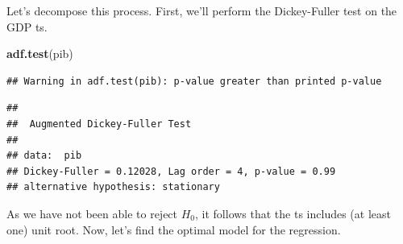 \documentclass[11pt, a4paper]{report}
\newenvironment{Shaded}{\begin{snugshade}}{\end{snugshade}}
\newcommand{\KeywordTok}[1]{\textcolor[rgb]{0.13,0.29,0.53}{\textbf{#1}}}
\newcommand{\NormalTok}[1]{#1}
\theoremstyle{plain}
\theoremstyle{plain}
\theoremstyle{remark}
\begin{document}
Let's decompose this process. First, we'll perform the Dickey-Fuller
test on the GDP ts.

\begin{Shaded}
\begin{Highlighting}[]
\KeywordTok{adf.test}\NormalTok{(pib)}
\end{Highlighting}
\end{Shaded}

\begin{verbatim}
## Warning in adf.test(pib): p-value greater than printed p-value
\end{verbatim}

\begin{verbatim}
## 
##  Augmented Dickey-Fuller Test
## 
## data:  pib
## Dickey-Fuller = 0.12028, Lag order = 4, p-value = 0.99
## alternative hypothesis: stationary
\end{verbatim}

As we have not been able to reject \(H_0\), it follows that the ts
includes (at least one) unit root. Now, let's find the optimal model for
the regression.
\end{document}
